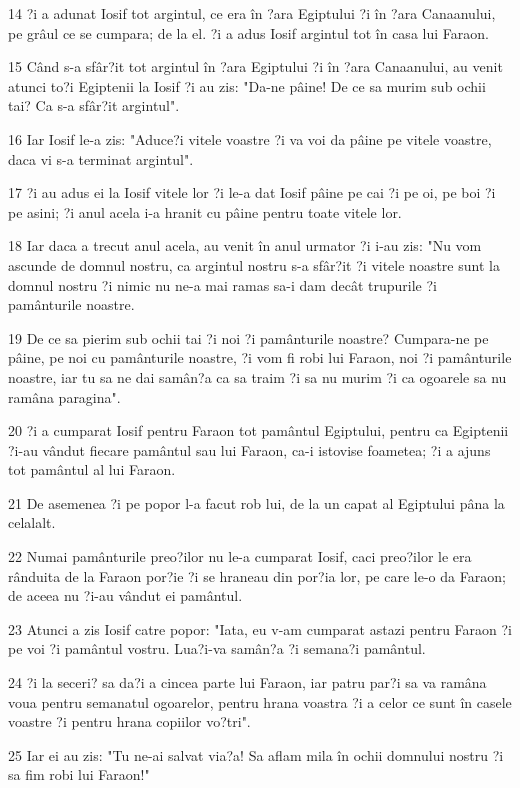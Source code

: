 \par 14 ?i a adunat Iosif tot argintul, ce era în ?ara Egiptului ?i în ?ara Canaanului, pe grâul ce se cumpara; de la el. ?i a adus Iosif argintul tot în casa lui Faraon.
\par 15 Când s-a sfâr?it tot argintul în ?ara Egiptului ?i în ?ara Canaanului, au venit atunci to?i Egiptenii la Iosif ?i au zis: "Da-ne pâine! De ce sa murim sub ochii tai? Ca s-a sfâr?it argintul".
\par 16 Iar Iosif le-a zis: "Aduce?i vitele voastre ?i va voi da pâine pe vitele voastre, daca vi s-a terminat argintul".
\par 17 ?i au adus ei la Iosif vitele lor ?i le-a dat Iosif pâine pe cai ?i pe oi, pe boi ?i pe asini; ?i anul acela i-a hranit cu pâine pentru toate vitele lor.
\par 18 Iar daca a trecut anul acela, au venit în anul urmator ?i i-au zis: "Nu vom ascunde de domnul nostru, ca argintul nostru s-a sfâr?it ?i vitele noastre sunt la domnul nostru ?i nimic nu ne-a mai ramas sa-i dam decât trupurile ?i pamânturile noastre.
\par 19 De ce sa pierim sub ochii tai ?i noi ?i pamânturile noastre? Cumpara-ne pe pâine, pe noi cu pamânturile noastre, ?i vom fi robi lui Faraon, noi ?i pamânturile noastre, iar tu sa ne dai samân?a ca sa traim ?i sa nu murim ?i ca ogoarele sa nu ramâna paragina".
\par 20 ?i a cumparat Iosif pentru Faraon tot pamântul Egiptului, pentru ca Egiptenii ?i-au vândut fiecare pamântul sau lui Faraon, ca-i istovise foametea; ?i a ajuns tot pamântul al lui Faraon.
\par 21 De asemenea ?i pe popor l-a facut rob lui, de la un capat al Egiptului pâna la celalalt.
\par 22 Numai pamânturile preo?ilor nu le-a cumparat Iosif, caci preo?ilor le era rânduita de la Faraon por?ie ?i se hraneau din por?ia lor, pe care le-o da Faraon; de aceea nu ?i-au vândut ei pamântul.
\par 23 Atunci a zis Iosif catre popor: "Iata, eu v-am cumparat astazi pentru Faraon ?i pe voi ?i pamântul vostru. Lua?i-va samân?a ?i semana?i pamântul.
\par 24 ?i la seceri? sa da?i a cincea parte lui Faraon, iar patru par?i sa va ramâna voua pentru semanatul ogoarelor, pentru hrana voastra ?i a celor ce sunt în casele voastre ?i pentru hrana copiilor vo?tri".
\par 25 Iar ei au zis: "Tu ne-ai salvat via?a! Sa aflam mila în ochii domnului nostru ?i sa fim robi lui Faraon!"
